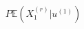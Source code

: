 \documentclass[preview]{standalone}
\begin{document}
\begin{align*}
P\mathbb{E}(X^{(r)}_1|u^{(1)})
\end{align*}
\end{document}

